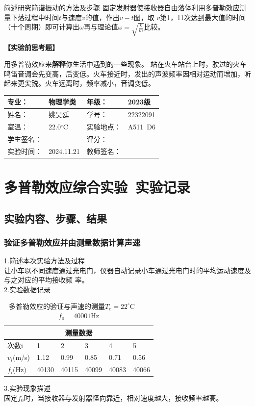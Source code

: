 \documentclass[dvipsnames, svgnames,a4paper,11pt]{article}
\begin{document}
\begin{question}
	简述研究简谐振动的方法及步骤
	\tcblower
	固定发射器使接收器自由落体利用多普勒效应测量下落过程中时间$t$与速度$v$的值，作出$v-t$图，取
	$v$第1，11次达到最大值的时间（十个周期）即可计算出$\omega$再与理论值$\omega=\sqrt{\frac{k}{m}}$比较。
\end{question}
\textbf{【实验前思考题】}\\
\begin{question}
	用多普勒效应来\textbf{解释}你生活中遇到的一些现象。
	\tcblower
	站在火车站台上时，驶过的火车鸣笛音调会先变高，后变低。火车接近时，发出的声波频率因相对运动而增加，听起来更尖锐。火车远离时，频率减小，音调变低。
\end{question}


\clearpage
{}
\begin{table}
	\renewcommand\arraystretch{1.7}
	\centering
	\begin{tabularx}{\textwidth}{|X|X|X|X|}
	\hline
	专业：& 物理学类 &年级：& 2023级 \\
	\hline
	姓名： &姚昊廷& 学号：&22322091  \\
	\hline
	室温：&22.0$^\circ$C&实验地点：&A511\ D6\\
	\hline
	学生签名：& & 评分： &\\
	\hline
	实验时间：& 2024.11.21& 教师签名：&\\
	\hline
	\end{tabularx}
\end{table}
\section{多普勒效应综合实验\ \textbf{实验记录}}
\subsection{实验内容、步骤、结果}
\subsubsection{验证多普勒效应并由测量数据计算声速}
\noindent1.简述本次实验方法及过程\\
让小车以不同速度通过光电门，仪器自动记录小车通过光电门时的平均运动速度及与之对应的平均接收频
率。\\
\noindent2.实验数据记录
\begin{table}[H]
	\centering
	\caption{多普勒效应的验证与声速的测量\hfill$T_c=22^\circ$C\ \ \ \ $f_0=40001$Hz}
	\begin{tabularx}{\textwidth}{|X|X|X|X|X|X|}
		\hline
		\multicolumn{6}{|c|}{测量数据}\\
		\hline
		次数i&1&2&3&4&5\\
		\hline
		$v_i$(m/s)&1.12&0.99&0.85&0.71&0.56\\
		\hline
		$f_i$(Hz)&40130&40115&40099&40083&40066\\
		\hline
	\end{tabularx}
\end{table}
\noindent3.实验现象描述\\
固定$f_0$时，当接收器与发射器径向靠近，相对速度越大，接收频率越高。
\end{document}
